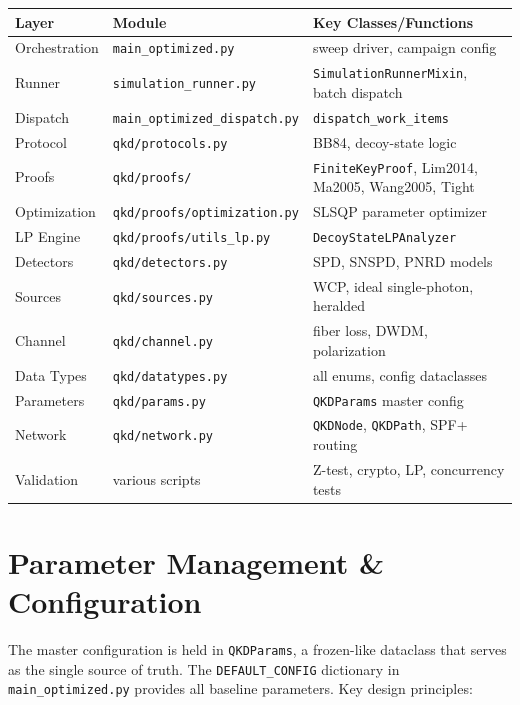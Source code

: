 \documentclass[11pt,a4paper,oneside]{report}
\begin{document}
\begin{center}
\begin{tabular}{@{}lll@{}}
\toprule
\textbf{Layer} & \textbf{Module} & \textbf{Key Classes/Functions} \\
\midrule
Orchestration & \texttt{main\_optimized.py} & sweep driver, campaign config \\
Runner & \texttt{simulation\_runner.py} & \texttt{SimulationRunnerMixin}, batch dispatch \\
Dispatch & \texttt{main\_optimized\_dispatch.py} & \texttt{dispatch\_work\_items} \\
Protocol & \texttt{qkd/protocols.py} & BB84, decoy-state logic \\
Proofs & \texttt{qkd/proofs/} & \texttt{FiniteKeyProof}, Lim2014, Ma2005, Wang2005, Tight \\
Optimization & \texttt{qkd/proofs/optimization.py} & SLSQP parameter optimizer \\
LP Engine & \texttt{qkd/proofs/utils\_lp.py} & \texttt{DecoyStateLPAnalyzer} \\
Detectors & \texttt{qkd/detectors.py} & SPD, SNSPD, PNRD models \\
Sources & \texttt{qkd/sources.py} & WCP, ideal single-photon, heralded \\
Channel & \texttt{qkd/channel.py} & fiber loss, DWDM, polarization \\
Data Types & \texttt{qkd/datatypes.py} & all enums, config dataclasses \\
Parameters & \texttt{qkd/params.py} & \texttt{QKDParams} master config \\
Network & \texttt{qkd/network.py} & \texttt{QKDNode}, \texttt{QKDPath}, SPF+ routing \\
Validation & various scripts & Z-test, crypto, LP, concurrency tests \\
\bottomrule
\end{tabular}
\end{center}

\section{Parameter Management \& Configuration}

The master configuration is held in \texttt{QKDParams}, a frozen-like dataclass that serves as the single source of truth. The \texttt{DEFAULT\_CONFIG} dictionary in \texttt{main\_optimized.py} provides all baseline parameters. Key design principles:
\end{document}
